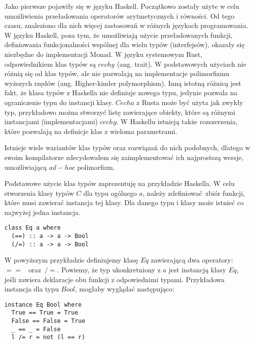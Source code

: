 \documentclass[declaration,shortabstract]{iithesis}
\begin{document}
Jako pierwsze pojawiły się w języku Haskell. Początkowo zostały użyte w celu 
umożliwienia przeładowania operatorów arytmetycznych i równości. Od tego czasu, 
znaleziono dla nich więcej zastosowań w różnych językach programowania. W języku
Haskell, poza tym, że umożliwiają użycie przeładowanych funkcji, definiowania 
funkcjonalności wspólnej dla wielu typów (interfejsów), okazały się niezbędne 
do implementacji Monad. W języku systemowym Rust, odpowiednikiem klas typów są
$cechy$ (ang. trait). W podstawowych użyciach nie różnią się od klas typów, ale 
nie pozwalają na implementacje polimorfizmu wyższych rzędów \cite{no_hkt_in_rust} (ang. 
Higher-kinder polymorphism). Inną istotną różnicą jest fakt, że klasa typów z 
Haskella nie definiuje nowego typu, jedynie pozwala na ograniczenie typu do 
instancji klasy. $Cecha$ z Rusta może być użyta jak zwykły typ, przykładowo 
można stworzyć listę zawierające obiekty, które są różnymi instancjami 
(implementacjami) $cechy$. W Haskellu istnieją także rozszerzenia, które 
pozwalają na definicje klas z wieloma parametrami. 


Istnieje wiele wariantów klas typów oraz rozwiązań do nich podobnych, dlatego w swoim kompilatorze zdecydowałem się zaimplementować ich najprostszą wersje, 
umożliwiającą $ad-hoc$ polimorfizm.

Podstawowe użycie klas typów zaprezentuję na przykładzie Haskella. 
W celu stworzenia klasy typów $C$ dla typu ogólnego $a$, należy 
zdefiniować zbiór funkcji, które musi zawierać instancja tej klasy. Dla danego 
typu i klasy może istnieć co najwyżej jedna instancja. 

\begin{lstlisting}[frame=single, caption=Przykładowa definicja klasy typów.]
class Eq a where
  (==) :: a -> a -> Bool
  (/=) :: a -> a -> Bool
\end{lstlisting}

W powyższym przykładzie definiujemy klasę $Eq$ zawierającą dwa operatory:~$==$ 
~oraz~$/=$. Powiemy, że typ ukonkretniony z $a$ jest instancją klasy $Eq$, jeśli zawiera deklaracje obu funkcji z odpowiednimi typami. Przykładowa instancja dla typu $Bool$, mogłaby wyglądać następująco:

\begin{lstlisting}[frame=single, caption=Instancja klasy $Eq$ dla typu $Bool$.]
instance Eq Bool where
  True == True = True 
  False == False = True 
  _ == _ = False
  l /= r = not (l == r)
\end{lstlisting}
\end{document}
